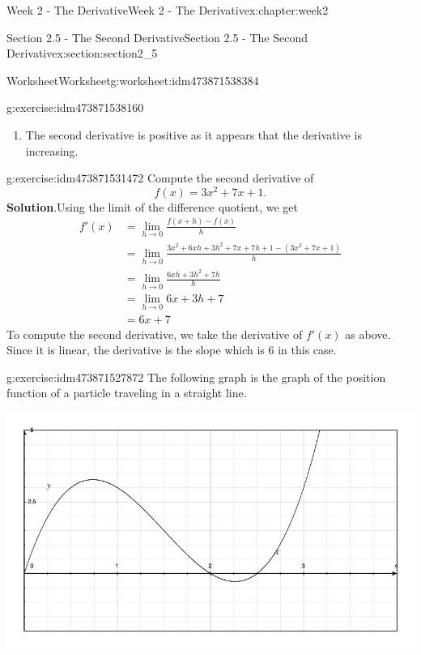 \documentclass[oneside,10pt,]{book}
\newcommand{\blocktitlefont}{\relax}
\numberwithin{equation}{section}
\newcommand{\amp}{&}
\begin{document}
\begin{chapterptx}{Week 2 - The Derivative}{}{Week 2 - The Derivative}{}{}{x:chapter:week2}
\begin{sectionptx}{Section 2.5 - The Second Derivative}{}{Section 2.5 - The Second Derivative}{}{}{x:section:section2_5}
\begin{worksheet-subsection}{Worksheet}{}{Worksheet}{}{}{g:worksheet:idm473871538384}
\begin{divisionexercise}{1}{}{}{g:exercise:idm473871538160}
\begin{enumerate}[label=(\alph*)]
\begin{equation*}
\begin{array}{| p{2.5cm} | p{2cm} | p{2cm} | p{2cm} | p{2cm} | p{2cm} |}
\hline \text{Time Interval} & 0-2 & 2-4 & 4-6 & 6-8 & 8-10\\
\hline \frac{ds}{dt} &  \frac{20-0}{2-0} = 10 & 16  & 19 & 21 & 34 \\
\hline
\end{array} 
\end{equation*}
%
\item{}The second derivative is positive as it appears that the derivative is increasing.%
\end{enumerate}
\end{divisionexercise}%
\begin{divisionexercise}{2}{}{}{g:exercise:idm473871531472}%
Compute the second derivative of%
\begin{equation*}
f(x) = 3x^2+7x+1 . 
\end{equation*}
%
\textbf{\blocktitlefont Solution}.\hypertarget{g:solution:idm473871531344}{}\quad{}Using the limit of the difference quotient, we get%
\begin{align*}
f'(x)  \amp = \lim_{h\to 0} \frac{f(x+h)-f(x)}{h} \\
\amp = \lim_{h\to 0} \frac{3x^2+6xh+3h^2+7x+7h+1 - (3x^2+7x+1)}{h} \\
\amp = \lim_{h\to 0} \frac{6xh+3h^2+7h}{h} \\
\amp = \lim_{h\to 0} 6x+3h+7\\
\amp = 6x+7
\end{align*}
To compute the second derivative, we take the derivative of \(f'(x)\) as above. Since it is linear, the derivative is the slope which is 6 in this case.%
\end{divisionexercise}%
\begin{divisionexercise}{3}{}{}{g:exercise:idm473871527872}%
\footnotemark{}The following graph is the graph of the position function of a particle traveling in a straight line.%
\par
\begin{image}{0}{1}{0}%
\includegraphics[width=\linewidth]{images/Math140S13wksht5g1.jpg}

\end{image}
\end{divisionexercise}
\end{worksheet-subsection}
\end{sectionptx}
\end{chapterptx}
\end{document}
